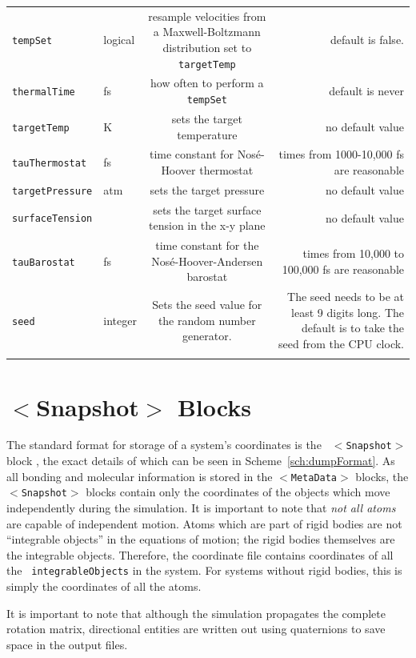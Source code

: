 \documentclass[]{book}
\begin{document}
\begin{longtable}[c]{ABCD}
{\tt tempSet} & logical & resample velocities from a Maxwell-Boltzmann
distribution set to {\tt targetTemp} & default is false. \\
{\tt thermalTime} & fs & how often to perform a {\tt tempSet} &
default is never \\
{\tt targetTemp} & K & sets the target temperature & no default value \\
{\tt tauThermostat} & fs & time constant for Nos\'{e}-Hoover
thermostat & times from 1000-10,000 fs are reasonable \\
{\tt targetPressure} & atm & sets the target pressure & no default value\\
{\tt surfaceTension} &  & sets the target surface tension in the x-y
plane & no default value \\
{\tt tauBarostat} & fs & time constant for the
Nos\'{e}-Hoover-Andersen barostat & times from 10,000 to 100,000 fs
are reasonable \\
{\tt seed } & integer & Sets the seed value for the random number generator. & The seed needs to be at least 9 digits long. The default is to take the seed from the CPU clock. \\
\label{table:genParams}
\end{longtable}


\section{\label{section:coordFiles}$<$Snapshot$>$ Blocks}

The standard format for storage of a system's coordinates is the {\tt
$<$Snapshot$>$} block , the exact details of which can be seen in
Scheme~\ref{sch:dumpFormat}. As all bonding and molecular information
is stored in the {\tt $<$MetaData$>$} blocks, the {\tt $<$Snapshot$>$} blocks
contain only the coordinates of the objects which move independently
during the simulation.  It is important to note that {\it not all
atoms} are capable of independent motion.  Atoms which are part of
rigid bodies are not ``integrable objects'' in the equations of
motion; the rigid bodies themselves are the integrable objects.
Therefore, the coordinate file contains coordinates of all the {\tt
integrableObjects} in the system.  For systems without rigid bodies,
this is simply the coordinates of all the atoms.

It is important to note that although the simulation propagates the
complete rotation matrix, directional entities are written out using
quaternions to save space in the output files.
\end{document}

